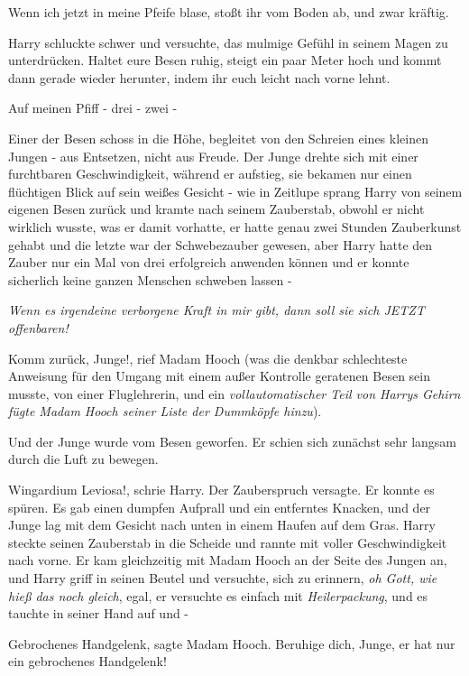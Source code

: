 \glqq Wenn ich jetzt in meine Pfeife blase, stoßt ihr vom Boden ab, und zwar
kräftig.\grqq{}

Harry schluckte schwer und versuchte, das mulmige Gefühl in seinem Magen zu
unterdrücken. \glqq Haltet eure Besen ruhig, steigt ein paar Meter hoch und
kommt dann gerade wieder herunter, indem ihr euch leicht nach vorne lehnt.

Auf meinen Pfiff - drei - zwei -\grqq{}

Einer der Besen schoss in die Höhe, begleitet von den Schreien eines kleinen
Jungen - aus Entsetzen, nicht aus Freude. Der Junge drehte sich mit einer
furchtbaren Geschwindigkeit, während er aufstieg, sie bekamen nur einen
flüchtigen Blick auf sein weißes Gesicht - wie in Zeitlupe sprang Harry von
seinem eigenen Besen zurück und kramte nach seinem Zauberstab, obwohl er nicht
wirklich wusste, was er damit vorhatte, er hatte genau zwei Stunden Zauberkunst
gehabt und die letzte war der Schwebezauber gewesen, aber Harry hatte den Zauber
nur ein Mal von drei erfolgreich anwenden können und er konnte sicherlich keine
ganzen Menschen schweben lassen -

\emph{Wenn es irgendeine verborgene Kraft in mir gibt, dann soll sie sich JETZT
offenbaren!}

\glqq Komm zurück, Junge!\grqq{}, rief Madam Hooch (was die denkbar schlechteste
Anweisung für den Umgang mit einem außer Kontrolle geratenen Besen sein musste,
von einer Fluglehrerin, und ein \emph{vollautomatischer Teil von Harrys Gehirn
fügte Madam Hooch seiner Liste der Dummköpfe hinzu}).

Und der Junge wurde vom Besen geworfen. Er schien sich zunächst sehr langsam
durch die Luft zu bewegen.

\glqq Wingardium Leviosa!\grqq{}, schrie Harry. Der Zauberspruch versagte. Er
konnte es spüren. Es gab einen dumpfen Aufprall und ein entferntes Knacken, und
der Junge lag mit dem Gesicht nach unten in einem Haufen auf dem Gras. Harry
steckte seinen Zauberstab in die Scheide und rannte mit voller Geschwindigkeit
nach vorne. Er kam gleichzeitig mit Madam Hooch an der Seite des Jungen an, und
Harry griff in seinen Beutel und versuchte, sich zu erinnern, \emph{oh Gott, wie
hieß das noch gleich}, egal, er versuchte es einfach mit \glqq
\emph{Heilerpackung}\grqq{}, und es tauchte in seiner Hand auf und -

\glqq Gebrochenes Handgelenk\grqq{}, sagte Madam Hooch. \glqq Beruhige dich,
Junge, er hat nur ein gebrochenes Handgelenk!\grqq{}

